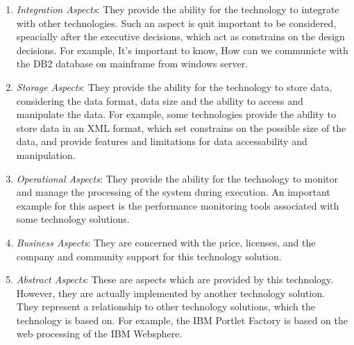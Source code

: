\documentclass[conference]{IEEEtran}
\begin{document}
\begin{enumerate}
{Microsoft Silverlight''}
\item \textit{Integration Aspects}: They provide the ability for the technology
to integrate with other technologies. Such an aspect is quit important to be
considered, speacially after the executive decisions, which act as constrains on
the design decisions. For example, It's important to know, How can we communicte with
the DB2 database on mainframe from windows server.
\item \textit{Storage Aspects}: They provide the ability for the technology to
store data, considering the data format, data size and the ability to access and
manipulate the data. For example, some technologies provide the ability to store
data in an XML format, which set constrains on the possible size of the data,
and provide features and limitations for data accessability and manipulation.
\item \textit{Operational Aspects}: They provide the ability for the technology
to monitor and manage the processing of the system during execution. An
important example for this aspect is the performance monitoring tools associated
with some technology solutions.
\item  \textit{Business Aspects}: They are concerned with the price, licenses,
and the company and community support for this technology solution.
\item \textit{Abstract Aspects}: These are aspects which are provided by this
technology. However, they are actually implemented by another technology
solution. They represent a relationship to other technology solutions, which the
technology is based on. For example, the IBM Portlet Factory is based on the web
processing of the IBM Websphere.
\end{enumerate}
\end{document}
